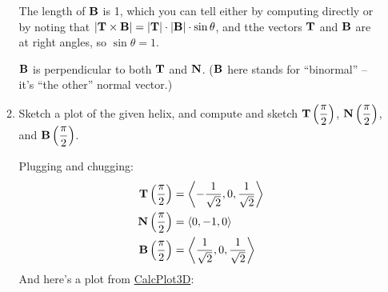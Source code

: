 \begin{enumerate}[leftmargin=0pt]
\begin{enumerate}
    \begin{red}
        The length of $\mathbf{B}$ is 1, which you can tell either by computing directly or by noting that $|\mathbf{T}\times\mathbf{B}| = |\mathbf{T}| \cdot |\mathbf{B}| \cdot \sin\theta$, and tthe vectors $\mathbf{T}$ and $\mathbf{B}$ are at right angles, so $\sin\theta = 1$.

        $\mathbf{B}$ is perpendicular to both $\mathbf{T}$ and $\mathbf{N}$. ($\mathbf{B}$ here stands for ``binormal'' -- it's ``the other'' normal vector.)
    \end{red}
    \item Sketch a plot of the given helix, and compute and sketch $\mathbf{T}\left(\dfrac\pi2\right)$, $\mathbf{N}\left(\dfrac\pi2\right)$, and $\mathbf{B}\left(\dfrac\pi2\right)$.

    \begin{red}
        Plugging and chugging:
        \begin{align*}
            \mathbf{T}\left(\dfrac\pi2\right) &= \left\langle
                -\dfrac{1}{\sqrt{2}}, 0, \dfrac{1}{\sqrt{2}}
                \right\rangle \\
            \mathbf{N}\left(\dfrac\pi2\right) &= \left\langle
                0, -1, 0
                \right\rangle \\
            \mathbf{B}\left(\dfrac\pi2\right) &= \left\langle
                \dfrac{1}{\sqrt{2}}, 0, \dfrac{1}{\sqrt{2}}
                \right\rangle
        \end{align*}
    And here's a plot from \href{https://c3d.libretexts.org/CalcPlot3D/index.html?type=spacecurve;spacecurve=curve;curvename=r_%7B1%7D;x=cos(t);y=sin(t);z=t;visible=true;width=2;view=0;tmin=0;tmax=pi;tsteps=500;color=rgb(255,0,0);showtrace=true;tval=pi/2;constcol=false;twod=false;arrows=0;showpt=true;traceptsize=4;trace=false;vel=false;acc=false;veceqs=true;osc=false;k=false;showtorsion=false;repeat=false;bounce=false;dashed=false;tanline=false;dropcurtain=false;showtnball=true;showtnb=true;showtnbeqs=true;showtnblabels=true;showoscplane=true;showrectplane=true;shownormplane=true;optimizecurve=true;maxjointangle=10&type=window;showfunnot=false;hsrmode=0;nomidpts=true;anaglyph=-1;center=8.236391035463326,4.755282581475768,3.0901699437494714,1;focus=0,0,0,1;up=-0.35224426555364663,-0.2033683215378999,0.913545457642601,1;transparent=false;alpha=140;twoviews=false;unlinkviews=false;axisextension=0.7;shownormals=false;shownormalsatpts=false;xaxislabel=x;yaxislabel=y;zaxislabel=z;edgeson=true;faceson=true;showbox=true;showaxes=true;showticks=true;perspective=true;centerxpercent=0.5;centerypercent=0.7500000000000002;rotationsteps=30;autospin=true;xygrid=false;yzgrid=false;xzgrid=false;gridsonbox=true;gridplanes=false;gridcolor=rgb(128,128,128);lastaddedsurfaceactive=true;disabletrace=false;activefun=-1;xmin=-2;xmax=2;ymin=-2;ymax=2;zmin=0;zmax=4;xscale=1;yscale=1;zscale=1;zcmin=-4;zcmax=4;xscalefactor=1;yscalefactor=1;zscalefactor=1;tracemode=0;keep2d=false;zoom=1.163529}{CalcPlot3D}:


\end{red}
\end{enumerate}
\end{enumerate}
